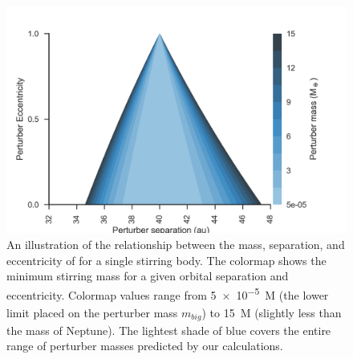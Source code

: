 \documentclass[modern]{aastex62}
\begin{document}
\begin{figure}
    \includegraphics[width=\linewidth]{../../band6/plots/current/perturber_plot.png}
    \caption{An illustration of the relationship between the  mass, separation, and eccentricity of for a single stirring body. 
    The colormap shows the minimum stirring mass for a given orbital separation and eccentricity. 
    Colormap values range from \SI{5e-5}{M_\earth} (the lower limit placed on the perturber mass $m_{big}$) to \SI{15}{M_\earth} (slightly less than the mass of Neptune).
    The lightest shade of blue covers the entire range of perturber masses predicted by our calculations.}
    \label{fig: perturber}
\end{figure}
\end{document}
